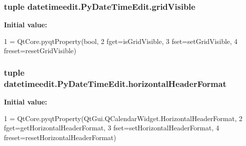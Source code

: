 \subsubsection[{grid\+Visible}]{\setlength{\rightskip}{0pt plus 5cm}tuple datetimeedit.\+Py\+Date\+Time\+Edit.\+grid\+Visible\hspace{0.3cm}{\ttfamily [static]}}\label{classdatetimeedit_1_1PyDateTimeEdit_aa592a5125494beb3f3c50d8b3ee4a054}
{\bfseries Initial value\+:}
\begin{DoxyCode}
1 = QtCore.pyqtProperty(bool,
2                                       fget=isGridVisible,
3                                       fset=setGridVisible,
4                                       freset=resetGridVisible)
\end{DoxyCode}
\hypertarget{classdatetimeedit_1_1PyDateTimeEdit_aa305ad16c5dd857f0e24b1fd8d396084}{}
\subsubsection[{horizontal\+Header\+Format}]{\setlength{\rightskip}{0pt plus 5cm}tuple datetimeedit.\+Py\+Date\+Time\+Edit.\+horizontal\+Header\+Format\hspace{0.3cm}{\ttfamily [static]}}\label{classdatetimeedit_1_1PyDateTimeEdit_aa305ad16c5dd857f0e24b1fd8d396084}
{\bfseries Initial value\+:}
\begin{DoxyCode}
1 = QtCore.pyqtProperty(QtGui.QCalendarWidget.HorizontalHeaderFormat,
2                                                  fget=getHorizontalHeaderFormat,
3                                                  fset=setHorizontalHeaderFormat,
4                                                  freset=resetHorizontalHeaderFormat)
\end{DoxyCode}
\hypertarget{classdatetimeedit_1_1PyDateTimeEdit_a09672d719eac0485720c60b9b8a71c59}{}
